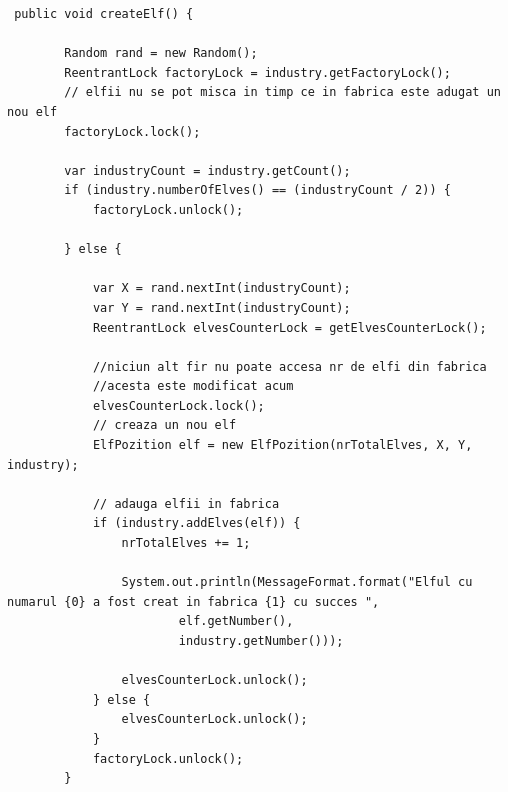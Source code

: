\documentclass{article}
\begin{document}
\begin{lstlisting}
 public void createElf() {
 
        Random rand = new Random();
        ReentrantLock factoryLock = industry.getFactoryLock();
        // elfii nu se pot misca in timp ce in fabrica este adugat un nou elf
        factoryLock.lock();
        
        var industryCount = industry.getCount();
        if (industry.numberOfElves() == (industryCount / 2)) {
            factoryLock.unlock();
            
        } else {
        
            var X = rand.nextInt(industryCount);
            var Y = rand.nextInt(industryCount);
            ReentrantLock elvesCounterLock = getElvesCounterLock();
            
            //niciun alt fir nu poate accesa nr de elfi din fabrica
            //acesta este modificat acum
            elvesCounterLock.lock();
            // creaza un nou elf
            ElfPozition elf = new ElfPozition(nrTotalElves, X, Y, industry);
            
            // adauga elfii in fabrica
            if (industry.addElves(elf)) {
                nrTotalElves += 1;
                
                System.out.println(MessageFormat.format("Elful cu numarul {0} a fost creat in fabrica {1} cu succes ",
                        elf.getNumber(),
                        industry.getNumber()));
                        
                elvesCounterLock.unlock();
            } else {
                elvesCounterLock.unlock();
            }
            factoryLock.unlock();
        }
\end{lstlisting}
\end{document}
